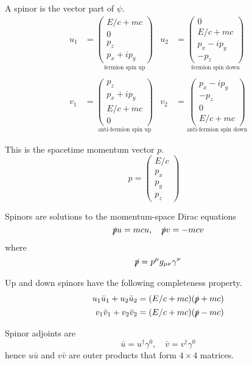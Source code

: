 A spinor is the vector part of $\psi$.
\begin{align*}
u_1&=\underset{\text{fermion spin up}}{\begin{pmatrix}E/c+mc\\0\\p_z\\p_x+ip_y\end{pmatrix}}
& u_2&=\underset{\text{fermion spin down}}{\begin{pmatrix}0\\E/c+mc\\p_x-ip_y\\-p_z\end{pmatrix}}
\\
\\
v_1&=\underset{\text{anti-fermion spin up}}{\begin{pmatrix}p_z\\p_x+ip_y\\E/c+mc\\0\end{pmatrix}}
& v_2&=\underset{\text{anti-fermion spin down}}{\begin{pmatrix}p_x-ip_y\\-p_z\\0\\E/c+mc\end{pmatrix}}
\end{align*}

This is the spacetime momentum vector $p$.
\begin{equation*}
p=\begin{pmatrix}E/c\\p_x\\p_y\\p_z\end{pmatrix}\quad
\end{equation*}

Spinors are solutions to the momentum-space Dirac equations
\begin{equation*}
\slashed pu=mcu,
\quad
\slashed pv=-mcv
\end{equation*}
where
\begin{equation*}
\slashed p=p^\mu g_{\mu\nu}\gamma^\nu
\end{equation*}

Up and down spinors have the following completeness property.
\begin{align*}
u_1\bar u_1+u_2\bar u_2&=(E/c+mc)(\slashed p+mc)
\\
v_1\bar v_1+v_2\bar v_2&=(E/c+mc)(\slashed p-mc)
\end{align*}

Spinor adjoints are
\begin{equation*}
\bar u=u^\dag\gamma^0,
\quad
\bar v=v^\dag\gamma^0
\end{equation*}
hence $u\bar u$ and $v\bar v$ are outer products that form $4\times4$ matrices.


